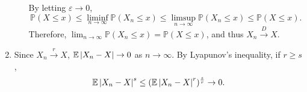 \documentclass{huhtakm-template-book-v2}
\newcommand{\prob}{\mathbb{P}}
\newcommand{\expect}{\mathbb{E}}
\begin{document}
\begin{proofing}
\begin{enumerate}
\begin{enumerate}
                By letting $\varepsilon \to 0$,
                \begin{equation*}
                    \prob(X \leq x) \leq \liminf_{n \to \infty}\prob(X_{n} \leq x) \leq \limsup_{n \to \infty}\prob(X_{n} \leq x) \leq \prob(X \leq x).
                \end{equation*}
                Therefore, $\lim_{n \to \infty}\prob(X_{n} \leq x) = \prob(X \leq x)$, and thus $X_{n} \xrightarrow{D} X$.
            \end{enumerate}
            \item Since $X_{n} \xrightarrow{r} X$, $\expect\abs{X_{n}-X} \to 0$ as $n \to \infty$. By Lyapunov's inequality, if $r \geq s$,
            \begin{equation*}
                \expect\abs{X_{n}-X}^{s} \leq (\expect\abs{X_{n}-X}^{r})^{\frac{s}{r}} \to 0.
            \end{equation*}
        \end{enumerate}
    \end{proofing}
    \newpage
\end{document}
